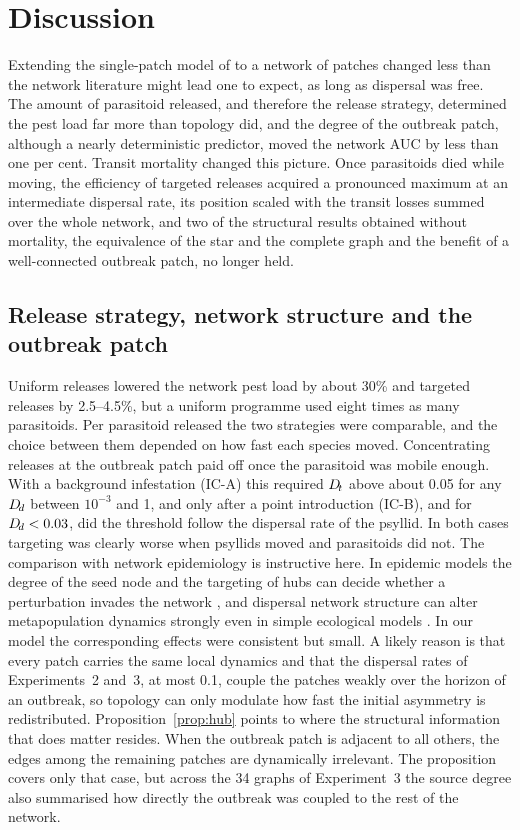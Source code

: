 \section{Discussion}
\label{sec:discussion}

Extending the single-patch model of \citep{RodriguezFalcon2026} to a network of patches changed less than the network literature might lead one to expect, as long as dispersal was free. The amount of parasitoid released, and therefore the release strategy, determined the pest load far more than topology did, and the degree of the outbreak patch, although a nearly deterministic predictor, moved the network AUC by less than one per cent. Transit mortality changed this picture. Once parasitoids died while moving, the efficiency of targeted releases acquired a pronounced maximum at an intermediate dispersal rate, its position scaled with the transit losses summed over the whole network, and two of the structural results obtained without mortality, the equivalence of the star and the complete graph and the benefit of a well-connected outbreak patch, no longer held.

\subsection*{Release strategy, network structure and the outbreak patch}

Uniform releases lowered the network pest load by about 30\% and targeted releases by 2.5--4.5\%, but a uniform programme used eight times as many parasitoids. Per parasitoid released the two strategies were comparable, and the choice between them depended on how fast each species moved. Concentrating releases at the outbreak patch paid off once the parasitoid was mobile enough. With a background infestation (IC-A) this required $D_{\!t}$ above about 0.05 for any $D_{\!d}$ between $10^{-3}$ and 1, and only after a point introduction (IC-B), and for $D_{\!d} < 0.03$, did the threshold follow the dispersal rate of the psyllid. In both cases targeting was clearly worse when psyllids moved and parasitoids did not. The comparison with network epidemiology is instructive here. In epidemic models the degree of the seed node and the targeting of hubs can decide whether a perturbation invades the network \citep{PastorSatorras2001,Colizza2007}, and dispersal network structure can alter metapopulation dynamics strongly even in simple ecological models \citep{holland2008,gilarranz2012}. In our model the corresponding effects were consistent but small. A likely reason is that every patch carries the same local dynamics and that the dispersal rates of Experiments~2 and~3, at most 0.1, couple the patches weakly over the horizon of an outbreak, so topology can only modulate how fast the initial asymmetry is redistributed. Proposition~\ref{prop:hub} points to where the structural information that does matter resides. When the outbreak patch is adjacent to all others, the edges among the remaining patches are dynamically irrelevant. The proposition covers only that case, but across the 34 graphs of Experiment~3 the source degree also summarised how directly the outbreak was coupled to the rest of the network.

